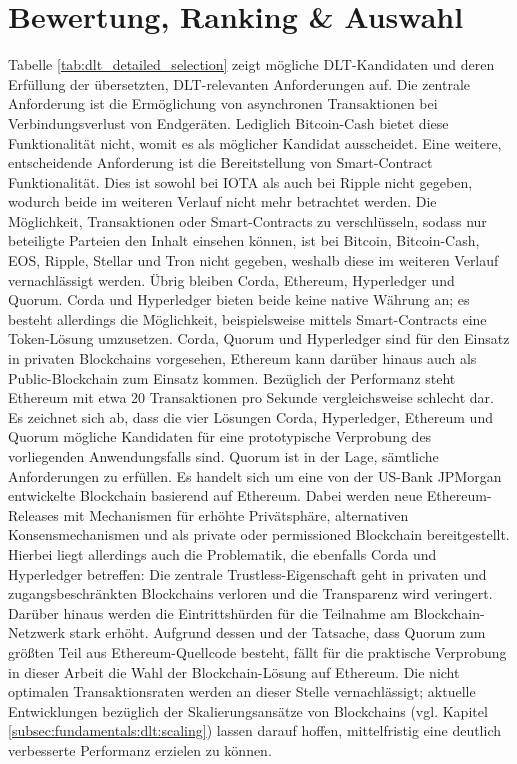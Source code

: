 %
%
\section{Bewertung, Ranking \& Auswahl}
\label{sec:dlt_selection:rating}
Tabelle \ref{tab:dlt_detailed_selection} zeigt mögliche \ac{DLT}-Kandidaten und deren Erfüllung der übersetzten, \ac{DLT}-relevanten Anforderungen auf. Die zentrale Anforderung ist die Ermöglichung von asynchronen Transaktionen bei Verbindungsverlust von Endgeräten. Lediglich Bitcoin-Cash bietet diese Funktionalität nicht, womit es als möglicher Kandidat ausscheidet. Eine weitere, entscheidende Anforderung ist die Bereitstellung von Smart-Contract Funktionalität. Dies ist sowohl bei IOTA als auch bei Ripple nicht gegeben, wodurch beide im weiteren Verlauf nicht mehr betrachtet werden. Die Möglichkeit, Transaktionen oder Smart-Contracts zu verschlüsseln, sodass nur beteiligte Parteien den Inhalt einsehen können, ist bei Bitcoin, Bitcoin-Cash, EOS, Ripple, Stellar und Tron nicht gegeben, weshalb diese im weiteren Verlauf vernachlässigt werden. Übrig bleiben Corda, Ethereum, Hyperledger und Quorum. Corda und Hyperledger bieten beide keine native Währung an; es besteht allerdings die Möglichkeit, beispielsweise mittels Smart-Contracts eine Token-Lösung umzusetzen. Corda, Quorum und Hyperledger sind für den Einsatz in privaten Blockchains vorgesehen, Ethereum kann darüber hinaus auch als Public-Blockchain zum Einsatz kommen. Bezüglich der Performanz steht Ethereum mit etwa 20 Transaktionen pro Sekunde vergleichsweise schlecht dar.\\
Es zeichnet sich ab, dass die vier Lösungen Corda, Hyperledger, Ethereum und Quorum mögliche Kandidaten für eine prototypische Verprobung des vorliegenden Anwendungsfalls sind. Quorum ist in der Lage, sämtliche Anforderungen zu erfüllen. Es handelt sich um eine von der US-Bank JPMorgan entwickelte Blockchain basierend auf Ethereum. Dabei werden neue Ethereum-Releases mit Mechanismen für erhöhte Privätsphäre, alternativen Konsensmechanismen und als private oder permissioned Blockchain bereitgestellt. Hierbei liegt allerdings auch die Problematik, die ebenfalls Corda und Hyperledger betreffen: Die zentrale Trustless-Eigenschaft geht in privaten und zugangsbeschränkten Blockchains verloren und die Transparenz wird veringert. Darüber hinaus werden die Eintrittshürden für die Teilnahme am Blockchain-Netzwerk stark erhöht. Aufgrund dessen und der Tatsache, dass Quorum zum größten Teil aus Ethereum-Quellcode besteht, fällt für die praktische Verprobung in dieser Arbeit die Wahl der Blockchain-Lösung auf Ethereum. Die nicht optimalen Transaktionsraten werden an dieser Stelle vernachlässigt; aktuelle Entwicklungen bezüglich der Skalierungsansätze von Blockchains (vgl. Kapitel \ref{subsec:fundamentals:dlt:scaling}) lassen darauf hoffen, mittelfristig eine deutlich verbesserte Performanz erzielen zu können.
